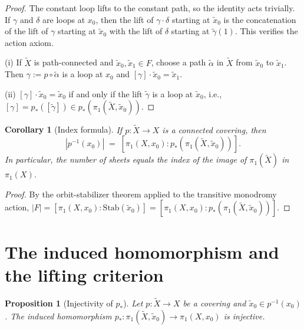 \documentclass[12pt,a4paper,openany]{book}
\theoremstyle{definition}
\theoremstyle{plain}
\newtheorem{proposition}[definition]{Proposition}
\newtheorem{corollary}[definition]{Corollary}
\theoremstyle{remark}
\newcommand{\abs}[1]{\left|#1\right|}
\begin{document}
\begin{proof}
  The constant loop lifts to the constant path, so the identity acts
  trivially.  If $\gamma$ and $\delta$ are loops at $x_0$, then the lift of
  $\gamma \cdot \delta$ starting at $\tilde{x}_0$ is the concatenation of the
  lift of $\gamma$ starting at $\tilde{x}_0$ with the lift of $\delta$
  starting at $\tilde{\gamma}(1)$.  This verifies the action axiom.

  (i) If $\widetilde{X}$ is path-connected and $\tilde{x}_0, \tilde{x}_1 \in
  F$, choose a path $\tilde{\alpha}$ in $\widetilde{X}$ from $\tilde{x}_0$ to
  $\tilde{x}_1$.  Then $\gamma := p \circ \tilde{\alpha}$ is a loop at $x_0$
  and $[\gamma] \cdot \tilde{x}_0 = \tilde{x}_1$.

  (ii) $[\gamma] \cdot \tilde{x}_0 = \tilde{x}_0$ if and only if the lift
  $\tilde{\gamma}$ is a loop at $\tilde{x}_0$, i.e.,
  $[\gamma] = p_*([\tilde{\gamma}]) \in p_*(\pi_1(\widetilde{X},
  \tilde{x}_0))$.
\end{proof}

\begin{corollary}[Index formula]\label{cor:index-formula}
  If $p\colon \widetilde{X} \to X$ is a connected covering, then
  \[
    \abs{p^{-1}(x_0)} \;=\; [\pi_1(X, x_0) : p_*(\pi_1(\widetilde{X}, \tilde{x}_0))].
  \]
  In particular, the number of sheets equals the index of the image of
  $\pi_1(\widetilde{X})$ in $\pi_1(X)$.
\end{corollary}

\begin{proof}
  By the orbit-stabilizer theorem applied to the transitive monodromy action,
  $\abs{F} = [\pi_1(X, x_0) : \mathrm{Stab}(\tilde{x}_0)] = [\pi_1(X, x_0) :
  p_*(\pi_1(\widetilde{X}, \tilde{x}_0))]$.
\end{proof}

\section{The induced homomorphism and the lifting criterion}\label{sec:induced-homo}

\begin{proposition}[Injectivity of $p_*$]\label{prop:p-star-injective}
  Let $p\colon \widetilde{X} \to X$ be a covering and $\tilde{x}_0 \in
  p^{-1}(x_0)$.  The induced homomorphism
  $p_*\colon \pi_1(\widetilde{X}, \tilde{x}_0) \to \pi_1(X, x_0)$ is
  injective.
\end{proposition}
\end{document}
